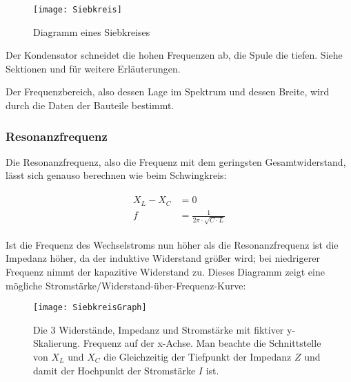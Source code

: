 \begin{figure}[h!]
	\centering
	\texttt{[image: Siebkreis]}
	\caption{Diagramm eines Siebkreises}
\end{figure}

Der Kondensator \glqq schneidet\grqq{} die hohen Frequenzen \glqq ab\grqq , die Spule die tiefen. Siehe Sektionen  und  für weitere Erläuterungen.

Der Frequenzbereich, also dessen Lage im Spektrum und dessen Breite, wird durch die Daten der Bauteile bestimmt.


\subsubsection{Resonanzfrequenz}

Die Resonanzfrequenz, also die Frequenz mit dem geringsten Gesamtwiderstand, lässt sich genauso berechnen wie beim Schwingkreis:

\begin{align}	\label{eq:ResonanzfrequenzSiebkreis}
\begin{split}
	X_L - X_C &= 0 \\
	f &= \frac{1}{2 \pi \cdot \sqrt{C \cdot L}}
\end{split}
\end{align}

Ist die Frequenz des Wechselstroms nun höher als die Resonanzfrequenz ist die Impedanz höher, da der induktive Widerstand größer wird; bei niedrigerer Frequenz nimmt der kapazitive Widerstand zu. Dieses Diagramm zeigt eine mögliche Stromstärke/Widerstand-über-Frequenz-Kurve:

\begin{figure}[h!]
	\centering
	\texttt{[image: SiebkreisGraph]}
	\caption{Die 3 Widerstände, Impedanz und Stromstärke mit fiktiver y-Skalierung. Frequenz auf der x-Achse. Man beachte die Schnittstelle von $X_L$ und $X_C$ die Gleichzeitig der Tiefpunkt der Impedanz $Z$ und damit der Hochpunkt der Stromstärke $I$ ist.}
\end{figure}




